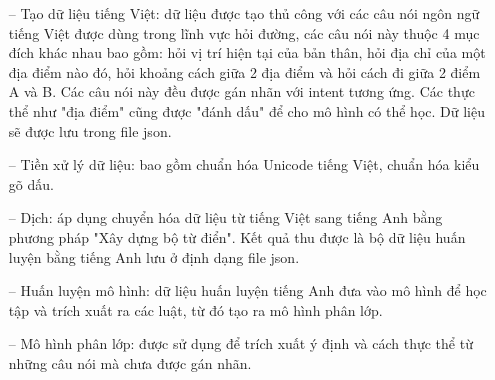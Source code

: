 \begin{itemize}

    \item[--]Tạo dữ liệu tiếng Việt: dữ liệu được tạo thủ công với các câu nói ngôn ngữ tiếng Việt được dùng trong lĩnh vực hỏi đường, các câu nói này thuộc 4 mục đích khác nhau bao gồm: hỏi vị trí hiện tại của bản thân, hỏi địa chỉ của một địa điểm nào đó, hỏi khoảng cách giữa 2 địa điểm và hỏi cách đi giữa 2 điểm A và B. Các câu nói này đều được gán nhãn với intent tương ứng. Các thực thể như "địa điểm" cũng được "đánh dấu" để cho mô hình có thể học. Dữ liệu sẽ được lưu trong file json.

\item[--]Tiền xử lý dữ liệu: bao gồm chuẩn hóa Unicode tiếng Việt, chuẩn hóa kiểu gõ dấu.

\item[--]Dịch: áp dụng chuyển hóa dữ liệu từ tiếng Việt sang tiếng Anh bằng phương pháp "Xây dựng bộ từ điển". Kết quả thu được là bộ dữ liệu huấn luyện bằng tiếng Anh lưu ở định dạng file json.

\item[--]Huấn luyện mô hình: dữ liệu huấn luyện tiếng Anh đưa vào mô hình để học tập và trích xuất ra các luật, từ đó tạo ra mô hình phân lớp.
\item[--]Mô hình phân lớp: được sử dụng để trích xuất ý định và cách thực thể từ những câu nói mà chưa được gán nhãn.
\end{itemize}



